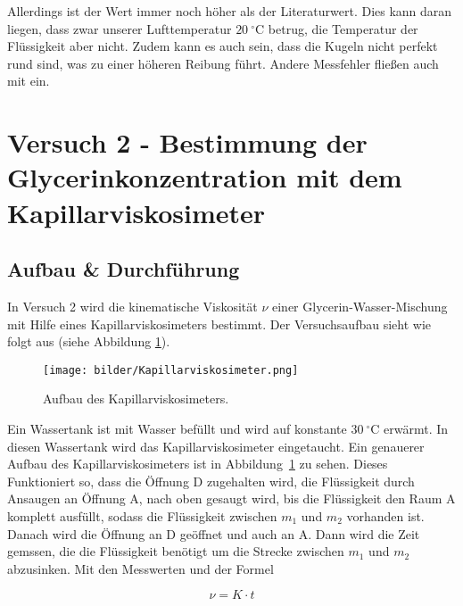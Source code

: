             Allerdings ist der Wert immer noch höher als der Literaturwert. Dies kann daran liegen, dass zwar unserer Lufttemperatur $20\ \mathrm{^\circ C}$ betrug, die Temperatur der Flüssigkeit aber nicht. Zudem kann es auch sein, dass die Kugeln nicht perfekt rund sind, was zu einer höheren Reibung führt. Andere Messfehler fließen auch mit ein.
        
    \section{Versuch 2 - Bestimmung der Glycerinkonzentration mit dem Kapillarviskosimeter}
    \label{sec:Versuch2}

        \subsection{Aufbau \& Durchführung}
            
            In Versuch 2 wird die kinematische Viskosität $\nu$ einer Glycerin-Wasser-Mischung mit Hilfe eines Kapillarviskosimeters bestimmt. Der Versuchsaufbau sieht wie folgt aus (siehe Abbildung \ref{fig:Kapillarviskosimeter}).

            \begin{figure}[h]
                \centering
                \texttt{[image: bilder/Kapillarviskosimeter.png]}
                \caption{Aufbau des Kapillarviskosimeters.}
                \label{fig:Kapillarviskosimeter}
            \end{figure}

            Ein Wassertank ist mit Wasser befüllt und wird auf konstante $30\ \mathrm{^\circ C}$ erwärmt. In diesen Wassertank wird das Kapillarviskosimeter eingetaucht. Ein genauerer Aufbau des Kapillarviskosimeters ist in Abbildung~\ref{fig:Kapillarviskosimeter} zu sehen. Dieses Funktioniert so, dass die Öffnung D zugehalten wird, die Flüssigkeit durch Ansaugen an Öffnung A, nach oben gesaugt wird, bis die Flüssigkeit den Raum A komplett ausfüllt, sodass die Flüssigkeit zwischen $m_1$ und $m_2$ vorhanden ist. Danach wird die Öffnung an D geöffnet und auch an A. Dann wird die Zeit gemssen, die die Flüssigkeit benötigt um die Strecke zwischen $m_{1}$ und $m_{2}$ abzusinken. Mit den Messwerten und der Formel

            \begin{equation}
                \nu = K \cdot t
                \label{eq:kinetamischeViskosität}
            \end{equation}

